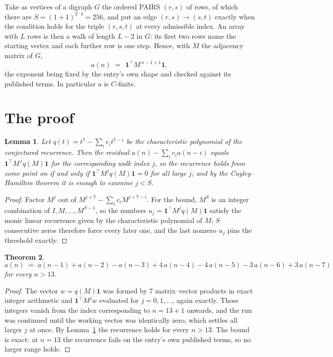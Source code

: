 \documentclass[11pt,a4paper]{article}
\theoremstyle{plain}
\newtheorem{theorem}{Theorem}
\newtheorem{lemma}[theorem]{Lemma}
\theoremstyle{definition}
\begin{document}
Take as vertices of a digraph $G$ the ordered PAIRS $(r,s)$ of rows, of which there are
$S=(1+1)^{2\cdot4}=256$, and put an edge $(r,s)\to(s,t)$ exactly when the condition
holds for the triple $(r,s,t)$ at every admissible index. An array with $L$ rows is then a
walk of length $L-2$ in $G$: its first two rows name the starting vertex and each further
row is one step. Hence, with $M$ the adjacency matrix of $G$,
\[
a(n)\;=\;\,\mathbf{1}^{\!\top}M^{\,n-1+1}\mathbf{1},
\]
the exponent being fixed by the entry's own shape and checked against its published terms.
In particular $a$ is $C$-finite.

\section{The proof}

\begin{lemma}\label{lem:crit}
Let $q(t)=t^{7}-\sum_i c_it^{7-i}$ be the characteristic polynomial of the
conjectured recurrence. Then the residual $a(n)-\sum_ic_ia(n-i)$ equals
$\mathbf{1}^{\!\top}M^{\,j}q(M)\mathbf{1}$ for the corresponding walk index
$j$, so the recurrence holds from some point on if and only if
$\mathbf{1}^{\!\top}M^{j}q(M)\mathbf{1}=0$ for all large $j$; and by the
Cayley--Hamilton theorem it is enough to examine $j<S$.
\end{lemma}

\begin{proof}
Factor $M^{j}$ out of $M^{j+7}-\sum_ic_iM^{j+7-i}$. For the bound, $M^{S}$
is an integer combination of $I,M,\dots,M^{S-1}$, so the numbers
$u_j=\mathbf{1}^{\!\top}M^{j}q(M)\mathbf{1}$ satisfy the monic linear recurrence given by
the characteristic polynomial of $M$; $S$ consecutive zeros therefore force every later one,
and the last nonzero $u_j$ pins the threshold exactly.
\end{proof}

\begin{theorem}
\[
a(n)\;=\;a(n-1) + a(n-2) - a(n-3) + 4\,a(n-4) - 4\,a(n-5) - 3\,a(n-6) + 3\,a(n-7)
\]
for every $n>13$.
\end{theorem}

\begin{proof}
The vector $w=q(M)\mathbf{1}$ was formed by $7$ matrix--vector products in exact
integer arithmetic and $\mathbf{1}^{\!\top}M^{j}w$ evaluated for $j=0,1,\dots$, again
exactly. Those integers vanish from the index corresponding to $n=13+1$ onwards, and the
run was continued until the working vector was identically zero, which settles all larger $j$
at once. By Lemma~\ref{lem:crit} the recurrence holds for every $n>13$. The bound is exact: at $n=13$ the recurrence fails on the entry's own published terms, so no larger range holds.
\end{proof}
\end{document}
